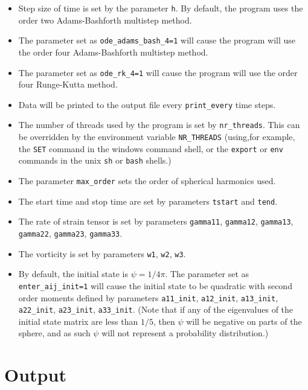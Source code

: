 \documentclass{amsart}
\begin{document}
\begin{itemize}
\item Step size of time is set by the parameter {\tt h}.  By default, the program uses the order two Adams-Bashforth multistep method.
\item The parameter set as {\tt ode\_adams\_bash\_4=1} will cause the program will use the order four Adams-Bashforth multistep method.
\item The parameter set as {\tt ode\_rk\_4=1} will cause the program will use the order four Runge-Kutta method.
\item Data will be printed to the output file every {\tt print\_every} time steps.
\item The number of threads used by the program is set by {\tt nr\_threads}.  This can be overridden by the environment variable {\tt NR\_THREADS} (using,for example, the {\tt SET} command in the windows command shell, or the {\tt export} or {\tt env} commands in the unix {\tt sh} or {\tt bash} shells.)
\item The parameter {\tt max\_order} sets the order of spherical harmonics used.
\item The start time and stop time are set by parameters {\tt tstart} and {\tt tend}.
\item The rate of strain tensor is set by parameters {\tt gamma11}, {\tt gamma12}, {\tt gamma13}, {\tt gamma22}, {\tt gamma23}, {\tt gamma33}.
\item The vorticity is set by parameters {\tt w1}, {\tt w2}, {\tt w3}.
\item By default, the initial state is $\psi = 1/4\pi$.  The parameter set as {\tt enter\_aij\_init=1} will cause the initial state to be quadratic with second order moments defined by parameters {\tt a11\_init}, {\tt a12\_init}, {\tt a13\_init}, {\tt a22\_init}, {\tt a23\_init}, {\tt a33\_init}.  (Note that if any of the eigenvalues of the initial state matrix are less than $1/5$, then $\psi$ will be negative on parts of the sphere, and as such $\psi$ will not represent a probability distribution.)
\end{itemize}

\section*{Output}
\end{document}
